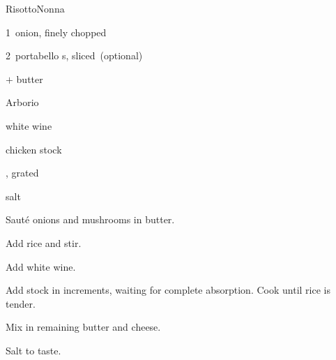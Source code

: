 \begin{recipe}{Risotto}{Nonna}{}

\begin{ingredients}
\item 1~onion, finely chopped
\item 2~portabello s, sliced~(optional)
\item {}$+$ butter
\item {} Arborio 
\item {} white wine
\item chicken stock
\item {}, grated
\item salt
\end{ingredients}

\begin{directions}
\item Saut\'e onions and mushrooms in  butter.
\item Add rice and stir.
\item Add white wine.
\item Add stock in \C{\half} increments, waiting for complete absorption. Cook until rice is tender.
\item Mix in remaining butter and cheese.
\item Salt to taste.
\end{directions}

\end{recipe}
